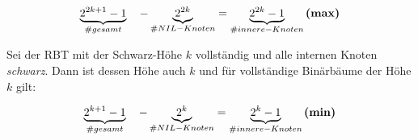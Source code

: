 \documentclass[ngerman,landscape,twocolumn]{adtexsheet}
\begin{document}
\begin{question}
\begin{enumerate}
        \[
        \underbrace{2^{2k+1}-1}_{\# gesamt}\quad -\underbrace{2^{2k}}_{\# NIL-Knoten} = \underbrace{2^{2k}-1}_{\# innere-Knoten} \hfill \textbf{(max)}
        \]
        
        Sei der RBT mit der Schwarz-Höhe $k$ vollständig und alle internen Knoten \emph{schwarz}. Dann ist dessen Höhe auch $k$ und für vollständige Binärbäume der Höhe $k$ gilt:
        
        \[
        \underbrace{2^{k+1}-1}_{\# gesamt}\quad -\underbrace{2^k}_{\# NIL-Knoten} = \underbrace{2^k -1}_{\# innere-Knoten} \hfill \textbf{(min)}
        \]
    \end{enumerate}
\end{question}
\end{document}
